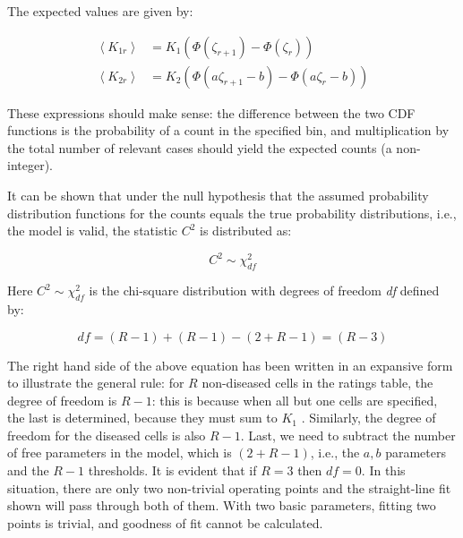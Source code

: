 \documentclass[
]{book}
\begin{document}
The expected values are given by:

\begin{equation}
\begin{split}
\left \langle K_{1r} \right \rangle &=K_1\left ( \Phi\left ( \zeta_{r+1} \right ) - \Phi\left ( \zeta_r \right )  \right ) \\
\left \langle K_{2r} \right \rangle &=K_2\left ( \Phi\left ( a\zeta_{r+1}-b \right ) - \Phi\left ( a\zeta_r - b\right )  \right )
\end{split}
\label{eq:binormal-modelGoodnessFitExpVals}
\end{equation}

These expressions should make sense: the difference between the two CDF functions is the probability of a count in the specified bin, and multiplication by the total number of relevant cases should yield the expected counts (a non-integer).

It can be shown that under the null hypothesis that the assumed probability distribution functions for the counts equals the true probability distributions, i.e., the model is valid, the statistic \(C^2\) is distributed as:

\begin{equation} 
C^2\sim \chi_{df}^{2}
\label{eq:binormal-modelGoodnessFitDistr}
\end{equation}

Here \(C^2\sim \chi_{df}^{2}\) is the chi-square distribution with degrees of freedom \emph{df} defined by:

\begin{equation} 
df=\left ( R-1 \right )+\left ( R-1 \right )-\left (2+ R-1 \right )=\left ( R-3 \right )
\label{eq:binormal-modelGoodnessFitdf}
\end{equation}

The right hand side of the above equation has been written in an expansive form to illustrate the general rule: for \(R\) non-diseased cells in the ratings table, the degree of freedom is \(R-1\): this is because when all but one cells are specified, the last is determined, because they must sum to \(K_1\) . Similarly, the degree of freedom for the diseased cells is also \(R-1\). Last, we need to subtract the number of free parameters in the model, which is \((2+R-1)\), i.e., the \(a,b\) parameters and the \(R-1\) thresholds. It is evident that if \(R = 3\) then \(df = 0\). In this situation, there are only two non-trivial operating points and the straight-line fit shown will pass through both of them. With two basic parameters, fitting two points is trivial, and goodness of fit cannot be calculated.
\end{document}
